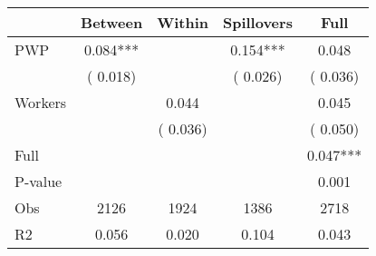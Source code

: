 
\begin{tabular}{l*{4}{c}}\hline&\multicolumn{1}{c}{Between}&\multicolumn{1}{c}{Within}&\multicolumn{1}{c}{Spillovers}&\multicolumn{1}{c}{Full}\\ \hline
 PWP           &              0.084***      &                                               &        0.154*** &         0.048                            \\ 
                               &        (       0.018)           &                                       &       (       0.026)     &      (       0.036)                                           \\ 
 Workers       &                                               &        0.044    &                                &             0.045                            \\ 
                               &                                               & (       0.036)                  &                                        &      (       0.050)                                           \\ 
\hline                                                                                                                                                                                                                                            
 Full                  &                                               &                                               &                                        &             0.047***                                     \\ 
 P-value               &                                               &                                               &                                        &             0.001                                           \\ 
 Obs                   &               2126               &       1924                       &       1386                &              2718                                               \\ 
 R2                    &                      0.056              &              0.020                      &              0.104               &                     0.043                                              \\ 
\hline \end{tabular}                                                                                                                                                                                                              